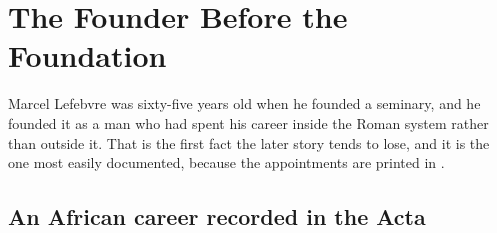 \section{The Founder Before the Foundation}

Marcel Lefebvre was sixty-five years old when he founded a seminary, and
he founded it as a man who had spent his career inside the Roman system
rather than outside it. That is the first fact the later story tends to
lose, and it is the one most easily documented, because the appointments
are printed in .

\subsection{An African career recorded in the Acta}

